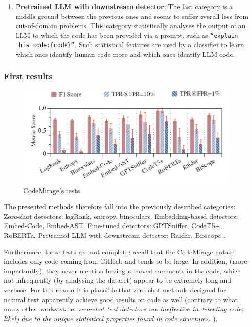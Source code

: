 \begin{enumerate}
    \item \textbf{Pretrained LLM with downstream detector}:
    The last category is a middle ground between the previous ones and seems to 
    suffer overall less from out-of-domain problems. This category statistically 
    analyses the output of an LLM to which the code has been provided via a prompt, 
    such as \texttt{“explain this code:\{code\}”}. Such statistical 
    features are used by a classifier to learn which ones identify 
    human code more and which ones identify 
    LLM code.
\end{enumerate}

\subsubsection{First results}

\begin{figure}[H]
    \centering
    \includegraphics[width=1\textwidth]{img/CodeMirage/tests.png}
    \caption{CodeMirage's tests}
    \label{fig:CodeMirage-tests}
\end{figure}

The presented methods therefore fall into the previously described categories:
Zero-shot detectors: logRank\cite{gehrmann2019gltr}, entropy\cite{lavergne2008detecting}, 
binoculars\cite{hans2024spotting}.
Embedding-based detectors: Embed-Code, Embed-AST.
Fine-tuned detectors: GPTSniffer\cite{nguyen2024gptsniffer}, CodeT5+\cite{wang2023codet5+}, RoBERTa\cite{liu2019roberta}.
Pretrained LLM with downstream detector: Raidar\cite{mao2024raidar}, Bioscope \cite{guo2024biscope}.


Furthermore, these tests are not complete: 
recall that the CodeMirage dataset includes 
only code coming from GitHub and tends to be 
large. In addition, (more importantly), 
they never mention having removed comments in the code, 
which not infrequently (by analysing the dataset) appear 
to be extremely long and verbose. For this reason it is 
plausible that zero-shot methods designed for natural text 
apparently achieve good results on code as well 
(contrary to what many other works state: 
\textit{ zero-shot text detectors are ineffective in detecting code, 
likely due to the unique statistical properties found in code structures.}
\cite{yang2023zero}
).

